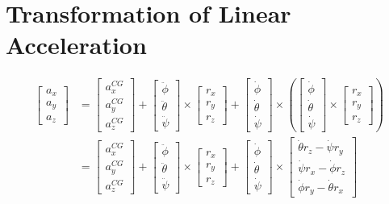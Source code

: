 \section{Transformation of Linear Acceleration}\label{sec:appendix-transformation-linacc}
\begin{align*}%
\begin{bmatrix}a_x \\ a_y \\ a_z\end{bmatrix}%
&=\begin{bmatrix}a_{x}^{CG} \\ a_{y}^{CG} \\ a_{z}^{CG}\end{bmatrix}%
+\begin{bmatrix}\ddot{\phi} \\ \ddot{\theta} \\ \ddot{\psi}\end{bmatrix}\times\begin{bmatrix}r_x \\ r_y \\ r_z\end{bmatrix}%
+\begin{bmatrix}\dot{\phi} \\ \dot{\theta} \\ \dot{\psi}\end{bmatrix}\times \left(\begin{bmatrix}\dot{\phi} \\ \dot{\theta} \\ \dot{\psi}\end{bmatrix}\times\begin{bmatrix}r_x \\ r_y \\ r_z\end{bmatrix}\right)\\%
&=\begin{bmatrix}a_{x}^{CG} \\ a_{y}^{CG} \\ a_{z}^{CG}\end{bmatrix}%
+\begin{bmatrix}\ddot{\phi} \\ \ddot{\theta} \\ \ddot{\psi}\end{bmatrix}\times\begin{bmatrix}r_x \\ r_y \\ r_z\end{bmatrix}%
+\begin{bmatrix}\dot{\phi} \\ \dot{\theta} \\ \dot{\psi}\end{bmatrix}\times\begin{bmatrix}\dot{\theta}r_z - \dot{\psi}r_y \\\dot{\psi}r_x - \dot{\phi}r_z \\\dot{\phi}r_y - \dot{\theta}r_x\end{bmatrix}\\%

\end{align*}
